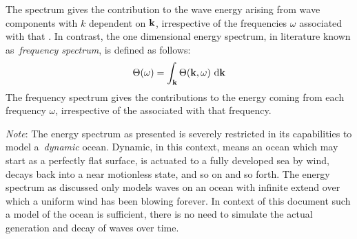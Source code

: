 The \wavenumber spectrum gives the contribution to the wave energy arising from
wave components with \wavenumber $k$ dependent on \wavevector $\mathbf{k}$,
irrespective of the frequencies $\omega$ associated with that \wavenumber. In
contrast, the one dimensional energy spectrum, in literature known
as~\emph{frequency spectrum}, is defined as follows:
\begin{equation}
\label{eq:energy_spectrum_1d}
 \Theta(\omega) = \int_{\mathbf{k}} \Theta(\mathbf{k}, \omega)~\mathrm{d}\mathbf{k}
\end{equation}
The frequency spectrum gives the contributions to the energy coming from each
frequency $\omega$, irrespective of the \wavenumbers associated with that
frequency.

\emph{Note}:
The energy spectrum as presented is severely restricted in its
capabilities to model a~\emph{dynamic} ocean. Dynamic, in this context, means an
ocean which may start as a perfectly flat surface, is actuated to a fully
developed sea by wind, decays back into a near motionless state, and so on and
so forth. The energy spectrum as discussed only models waves on an ocean with
infinite extend over which a uniform wind has been blowing forever. In context
of this document such a model of the ocean is sufficient, there is no need to
simulate the actual generation and decay of waves over time.


